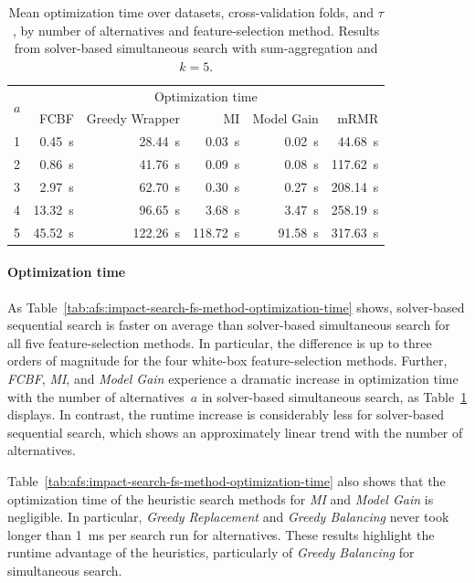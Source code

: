 \documentclass{article}
\theoremstyle{definition}
\begin{document}
\begin{table}[t]
	\centering
	\caption{
		Mean optimization time over datasets, cross-validation folds, and $\tau$, by number of alternatives and feature-selection method.
		Results from solver-based simultaneous search with sum-aggregation and $k=5$.
	}
	\begin{tabular}{lrrrrr}
		\toprule
		\multirow{2}{*}{$a$} & \multicolumn{5}{c}{Optimization time} \\
		\cmidrule(lr){2-6}
		& FCBF & Greedy Wrapper & MI & Model Gain & mRMR \\
		\midrule
		1 & 0.45~s & 28.44~s & 0.03~s & 0.02~s & 44.68~s \\
		2 & 0.86~s & 41.76~s & 0.09~s & 0.08~s & 117.62~s \\
		3 & 2.97~s & 62.70~s & 0.30~s & 0.27~s & 208.14~s \\
		4 & 13.32~s & 96.65~s & 3.68~s & 3.47~s & 258.19~s \\
		5 & 45.52~s & 122.26~s & 118.72~s & 91.58~s & 317.63~s \\
		\bottomrule
	\end{tabular}
	\label{tab:afs:impact-num-alternatives-fs-method-optimization-time}
\end{table}

\paragraph{Optimization time}

As Table~\ref{tab:afs:impact-search-fs-method-optimization-time} shows, solver-based sequential search is faster on average than solver-based simultaneous search for all five feature-selection methods.
In particular, the difference is up to three orders of magnitude for the four white-box feature-selection methods.
Further, \emph{FCBF}, \emph{MI}, and \emph{Model Gain} experience a dramatic increase in optimization time with the number of alternatives~$a$ in solver-based simultaneous search, as Table~\ref{tab:afs:impact-num-alternatives-fs-method-optimization-time} displays.
In contrast, the runtime increase is considerably less for solver-based sequential search, which shows an approximately linear trend with the number of alternatives.

Table~\ref{tab:afs:impact-search-fs-method-optimization-time} also shows that the optimization time of the heuristic search methods for \emph{MI} and \emph{Model Gain} is negligible.
In particular, \emph{Greedy Replacement} and \emph{Greedy Balancing} never took longer than 1~ms per search run for alternatives.
These results highlight the runtime advantage of the heuristics, particularly of \emph{Greedy Balancing} for simultaneous search.
\end{document}

